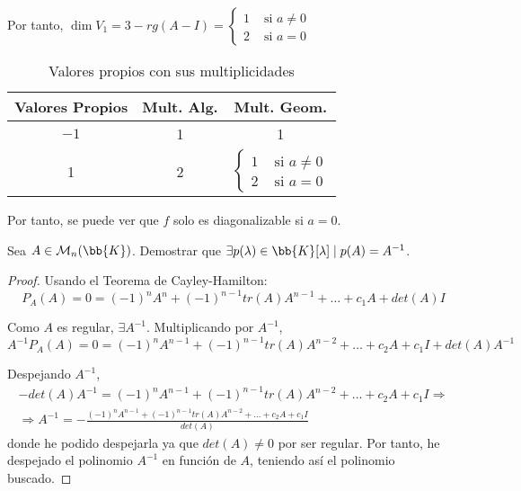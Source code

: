 \begin{ejercicio}
    Por tanto, $\dim V_1 = 3 - rg(A-I) = \left\{
        \begin{array}{cc}
            1 & \text{ si } a\neq 0 \\
            2 & \text{ si } a= 0
        \end{array}
        \right.$
    \begin{table}[H]
        \centering
        \begin{tabular}{c|c|c}
            Valores Propios & Mult. Alg. & Mult. Geom. \\ \hline 
            $-1$ & 1 & 1\\
            1 & 2 & $\left\{
        \begin{array}{cc}
            1 & \text{ si } a\neq 0 \\
            2 & \text{ si } a= 0
        \end{array}
        \right.$\\
        \end{tabular}
        \caption{Valores propios con sus multiplicidades}
    \end{table}

    Por tanto, se puede ver que $f$ solo es diagonalizable si $a=0$.
\end{ejercicio}

\begin{ejercicio}
    Sea $A\in \mathcal{M}_n(\bb{K})$. Demostrar que $\exists p(\lambda)\in \bb{K}[\lambda] \mid p(A)=A^{-1}$.
    \begin{proof}
        Usando el Teorema de Cayley-Hamilton:
        \begin{equation*}
            P_A(A) = 0 = (-1)^n A^n + (-1)^{n-1}tr(A)A^{n-1} + \dots + c_1A + det(A)I
        \end{equation*}
    
        Como $A$ es regular, $\exists A^{-1}$. Multiplicando por $A^{-1}$,
        \begin{equation*}
            A^{-1}P_A(A) = 0 = (-1)^n A^{n-1} + (-1)^{n-1}tr(A)A^{n-2} + \dots + c_2A + c_1I + det(A)A^{-1}
        \end{equation*}
    
        Despejando $A^{-1}$,
        \begin{multline*}
            -det(A)A^{-1} = (-1)^n A^{n-1} + (-1)^{n-1}tr(A)A^{n-2} + \dots + c_2A + c_1I
            \Longrightarrow \\ \Longrightarrow
            A^{-1} = -\frac{(-1)^n A^{n-1} + (-1)^{n-1}tr(A)A^{n-2} + \dots + c_2A + c_1I}{det(A)}
        \end{multline*}
        donde he podido despejarla ya que $det(A)\neq 0$ por ser regular. Por tanto, he despejado el polinomio $A^{-1}$ en función de $A$, teniendo así el polinomio buscado.
    \end{proof}
\end{ejercicio}

